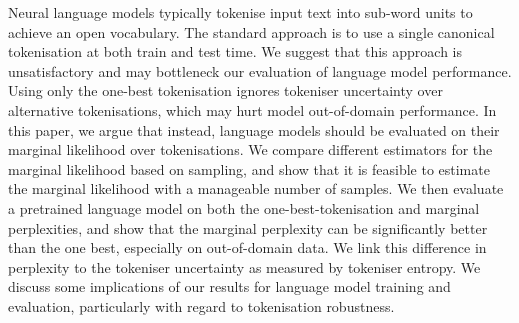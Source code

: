 Neural language models typically tokenise input text into sub-word units to achieve an open vocabulary. The standard approach is to use a single canonical tokenisation at both train and test time. We suggest that this approach is unsatisfactory and may bottleneck our evaluation of language model performance. Using only the one-best tokenisation ignores tokeniser uncertainty over alternative tokenisations, which may hurt model out-of-domain performance. In this paper, we argue that instead, language models should be evaluated on their marginal likelihood over tokenisations. We compare different estimators for the marginal likelihood based on sampling, and show that it is feasible to estimate the marginal likelihood with a manageable number of samples. We then evaluate a pretrained language model on both the one-best-tokenisation and marginal perplexities, and show that the marginal perplexity can be significantly better than the one best, especially on out-of-domain data. We link this difference in perplexity to the tokeniser uncertainty as measured by tokeniser entropy. We discuss some implications of our results for language model training and evaluation, particularly with regard to tokenisation robustness.
